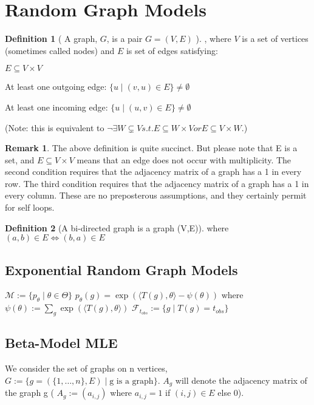 \documentclass{article}
\theoremstyle{definition}
\newtheorem{definition}{Definition}
\newtheorem*{remark}{Remark}
\begin{document}
\section{Random Graph Models}
\begin{definition}[ A graph, $G$, is a pair $G=(V,E)$ ], where $V$ is a set of vertices (sometimes called nodes) and $E$ is set of edges satisfying:
\item $E \subseteq V \times V $
\item At least one outgoing edge: $ \{ u \mid (v,u) \in E\} \neq \emptyset $
\item At least one incoming edge: $ \{ u \mid (u,v) \in E\} \neq \emptyset $
\end{definition}

(Note: this is equivalent to $ \neg \exists W \subsetneq V s.t. E \subseteq W\times V  or E \subseteq V\times W $.)

\begin{remark} The above definition is quite succinct. But please note that E is a set, and $E \subseteq V \times V$ means that an edge does not occur with multiplicity. The second condition requires that the adjacency matrix of a graph has a 1 in every row. The third condition requires that the adjacency matrix of a graph has a 1 in every column. These are no preposterous assumptions, and they certainly permit for self loops.
\end{remark}

\begin{definition}[A bi-directed graph is a graph (V,E)] where $(a,b) \in E \iff (b,a) \in E$ \end{definition}

\subsection{Exponential Random Graph Models}
\( \mathcal{M} := \{ p_\theta \mid \theta \in \Theta \} \)
\( p_\theta(g) = \exp(\langle T(g),\theta \rangle - \psi(\theta))\) where \(\psi(\theta) := \sum_{g}\exp(\langle T(g),\theta \rangle)\)
\( \mathcal{F}_{t_{obs}} := \{ g \mid T(g) = t_{obs} \} \)

\subsection{Beta-Model MLE}
We consider the set of graphs on n vertices, $ G  := \{ g=(\{1,\dots,n\},E) \mid \text{g is a graph} \}$.
$A_g $ will denote the adjacency matrix of the graph g ( $A_g := (a_{i,j}) $ where $a_{i,j} = 1$ if $(i,j) \in E$ else 0).
\end{document}
